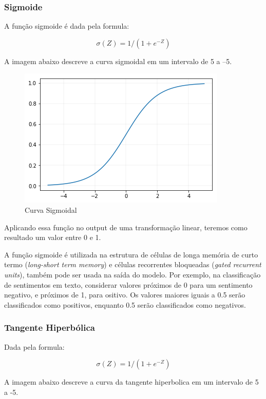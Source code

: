 \documentclass[12pt]{article}
\begin{document}
\subsubsection{Sigmoide}

A função sigmoide é dada pela formula:

\begin{equation}
    \sigma(Z) = 1/(1+e^{-Z})
\end{equation}

A imagem abaixo descreve a curva sigmoidal em um intervalo de 5 a –5.

\begin{figure}[!htb]
\centering
\includegraphics[width=.5\textwidth]{images/sigmoid.png}
\caption{Curva Sigmoidal}
\label{fig:sigmoid}
\end{figure}

Aplicando essa função no output de uma transformação linear, teremos como resultado um valor entre 0 e 1.

A função sigmoide é utilizada na estrutura de células de longa memória de curto termo (\textit{long-short term memory}) e células recorrentes bloqueadas (\textit{gated recurrent units}), também pode ser usada na saída do modelo. Por exemplo, na classificação de sentimentos em texto, considerar valores próximos de 0 para um sentimento negativo, e próximos de 1, para ositivo. Os valores maiores iguais a 0.5 serão classificados como positivos, enquanto 0.5 serão classificados como negativos.

\subsubsection{Tangente Hiperbólica}

Dada pela formula: 

\begin{equation}
    \sigma(Z) = 1/(1+e^{-Z})
\end{equation}

A imagem abaixo descreve a curva da tangente hiperbolica em um intervalo de 5 a -5.
\end{document}

